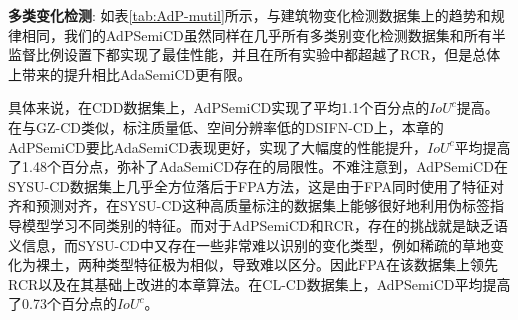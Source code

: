 \documentclass[lang=chs, degree=master, blindreview=false, adobe=false]{yanputhesis}
\begin{document}
\textbf{多类变化检测}:
如表\ref{tab:AdP-mutil}所示，与建筑物变化检测数据集上的趋势和规律相同，我们的AdPSemiCD虽然同样在几乎所有多类别变化检测数据集和所有半监督比例设置下都实现了最佳性能，并且在所有实验中都超越了RCR，但是总体上带来的提升相比AdaSemiCD更有限。

具体来说，在CDD数据集上，AdPSemiCD实现了平均1.1个百分点的$IoU^c$提高。在与GZ-CD类似，标注质量低、空间分辨率低的DSIFN-CD上，本章的AdPSemiCD要比AdaSemiCD表现更好，实现了大幅度的性能提升，$IoU^c$平均提高了1.48个百分点，弥补了AdaSemiCD存在的局限性。不难注意到，AdPSemiCD在SYSU-CD数据集上几乎全方位落后于FPA方法，这是由于FPA同时使用了特征对齐和预测对齐，在SYSU-CD这种高质量标注的数据集上能够很好地利用伪标签指导模型学习不同类别的特征。而对于AdPSemiCD和RCR，存在的挑战就是缺乏语义信息，而SYSU-CD中又存在一些非常难以识别的变化类型，例如稀疏的草地变化为裸土，两种类型特征极为相似，导致难以区分。因此FPA在该数据集上领先RCR以及在其基础上改进的本章算法。在CL-CD数据集上，AdPSemiCD平均提高了0.73个百分点的$IoU^c$。
\end{document}
